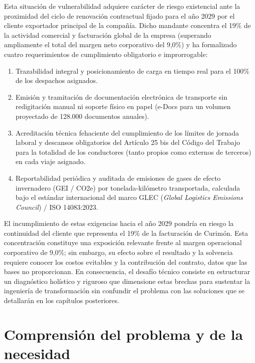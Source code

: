 Esta situación de vulnerabilidad adquiere carácter de riesgo existencial ante la proximidad del ciclo de renovación contractual fijado para el año 2029 por el cliente exportador principal de la compañía. Dicho mandante concentra el 19\% de la actividad comercial y facturación global de la empresa (superando ampliamente el total del margen neto corporativo del 9,0\%) y ha formalizado cuatro requerimientos de cumplimiento obligatorio e improrrogable:
\begin{enumerate}
  \item Trazabilidad integral y posicionamiento de carga en tiempo real para el 100\% de los despachos asignados.
  \item Emisión y tramitación de documentación electrónica de transporte sin redigitación manual ni soporte físico en papel (e-Docs para un volumen proyectado de 128.000 documentos anuales).
  \item Acreditación técnica fehaciente del cumplimiento de los límites de jornada laboral y descansos obligatorios del Artículo 25 bis del Código del Trabajo para la totalidad de los conductores (tanto propios como externos de terceros) en cada viaje asignado.
  \item Reportabilidad periódica y auditada de emisiones de gases de efecto invernadero (GEI / CO2e) por tonelada-kilómetro transportada, calculada bajo el estándar internacional del marco GLEC (\textit{Global Logistics Emissions Council}) / ISO 14083:2023.
\end{enumerate}

El incumplimiento de estas exigencias hacia el año 2029 pondría en riesgo la continuidad del cliente que representa el 19\% de la facturación de Curimón. Esta concentración constituye una exposición relevante frente al margen operacional corporativo de 9,0\%; sin embargo, su efecto sobre el resultado y la solvencia requiere conocer los costos evitables y la contribución del contrato, datos que las bases no proporcionan. En consecuencia, el desafío técnico consiste en estructurar un diagnóstico holístico y riguroso que dimensione estas brechas para sustentar la ingeniería de transformación sin confundir el problema con las soluciones que se detallarán en los capítulos posteriores.

\section{Comprensión del problema y de la necesidad}\label{sec:2-comprension}

